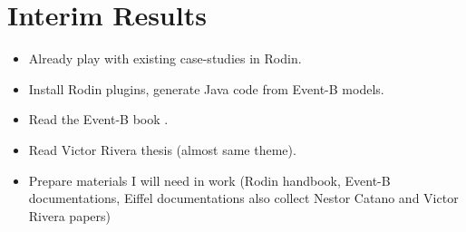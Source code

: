 \section{Interim Results}
\begin{itemize}
\item Already play with existing case-studies in Rodin.
\item Install Rodin plugins, generate Java code from Event-B models.
\item Read the Event-B book \cite{eventb}.
\item Read Victor Rivera thesis (almost same theme).
\item Prepare materials I will need in work (Rodin handbook, Event-B
  documentations, Eiffel documentations also collect Nestor Catano and Victor
  Rivera papers)
\end{itemize}
